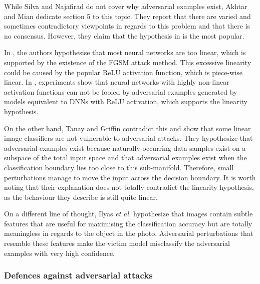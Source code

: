 \documentclass[11pt, a4paper, oneside]{article}
\begin{document}
While Silva and Najafirad \cite{silva_survey} do not cover why adversarial examples exist, Akhtar and Mian \cite{akhtar} dedicate section 5 to this topic. They report that there are varied and sometimes contradictory viewpoints in regards to this problem and that there is no consensus. However, they claim that the hypothesis in \cite{fgsm} is the most popular.

In \cite{fgsm}, the authors hypothesise that most neural networks are too linear, which is supported by the existence of the FGSM attack method. This excessive linearity could be caused by the popular ReLU activation function, which is piece-wise linear. In \cite{krotov2018dam}, experiments show that neural networks with highly non-linear activation functions can not be fooled by adversarial examples generated by models equivalent to DNNs with ReLU activation, which supports the linearity hypothesis. 

On the other hand, Tanay and Griffin \cite{tanay2016boundary} contradict this and show that some linear image classifiers are not vulnerable to adversarial attacks. They hypothesize that adversarial examples exist because naturally occurring data samples exist on a subspace of the total input space and that adversarial examples exist when the classification boundary lies too close to this sub-manifold. Therefore, small perturbations manage to move the input across the decision boundary. It is worth noting that their explanation does not totally contradict the linearity hypothesis, as the behaviour they describe is still quite linear.

On a different line of thought, Ilyas \textit{et al.} \cite{adv_examples_bugs} hypothesize that images contain subtle features that are useful for maximising the classification accuracy but are totally meaningless in regards to the object in the photo. Adversarial perturbations that resemble these features make the victim model misclassify the adversarial examples with very high confidence.

\subsubsection{Defences against adversarial attacks}
\end{document}
